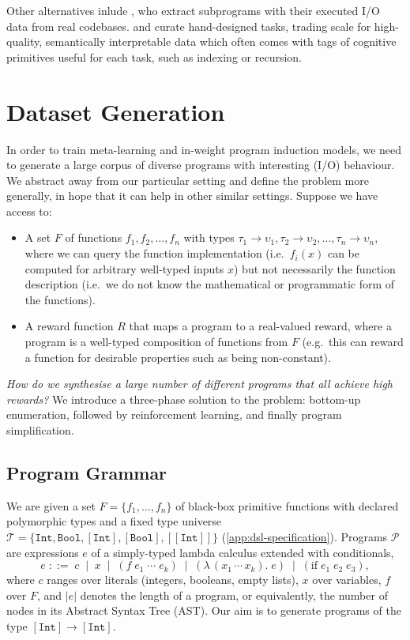 \documentclass[12pt]{article}
\begin{document}
Other alternatives inlude \citet{alet2021largescale}, who extract subprograms with their executed I/O data from real codebases. \citet{chollet2019measure} and \citet{rule2024symbolic} curate hand-designed tasks, trading scale for high-quality, semantically interpretable data which often comes with tags of cognitive primitives useful for each task, such as indexing or recursion.

\section{Dataset Generation}
\label{sec:dataset-generation}

In order to train meta-learning and in-weight program induction models, we need to generate a large corpus of diverse programs with interesting  (I/O) behaviour. We abstract away from our particular setting and define the problem more generally, in hope that it can help in other similar settings. Suppose we have access to:
\begin{itemize}
  \item A set $F$ of functions $f_1, f_2, \ldots, f_n$ with types
        $\tau_1 \to \upsilon_1, \tau_2 \to \upsilon_2, \ldots, \tau_n \to \upsilon_n$,
        where we can query the function implementation (i.e.\ $f_i(x)$ can be computed
        for arbitrary well-typed inputs $x$) but not necessarily the function description
        (i.e.\ we do not know the mathematical or programmatic form of the functions).
  \item A reward function $R$ that maps a program to a
        real-valued reward, where a program is a well-typed composition of functions from
        $F$ (e.g.\ this can reward a function for desirable properties such as being
        non-constant).
\end{itemize}

{\it How do we synthesise a large number of different programs that all achieve high rewards?} We introduce a three-phase solution to the problem: bottom-up enumeration, followed by reinforcement learning, and finally program simplification.

\subsection{Program Grammar}

We are given a set $F = \{f_1, \ldots, f_n\}$ of black-box primitive functions with declared polymorphic types and a fixed type universe $\mathcal{T} = \{\texttt{Int}, \texttt{Bool}, [\texttt{Int}], [\texttt{Bool}], [[\texttt{Int}]]\}$ (\cref{app:dsl-specification}). Programs $\mathcal{P}$ are expressions $e$ of a simply-typed lambda calculus extended with conditionals,
\[
  e \;::=\; c \;\mid\; x \;\mid\; (f\;e_1\;\cdots\;e_k) \;\mid\; (\lambda\,(x_1\,\cdots\,x_k).\;e) \;\mid\; (\mathrm{if}\;e_1\;e_2\;e_3),
\]
where $c$ ranges over literals (integers, booleans, empty lists), $x$ over variables, $f$ over $F$, and $|e|$ denotes the length of a program, or equivalently, the number of nodes in its Abstract Syntax Tree (AST). Our aim is to generate programs of the type $[\texttt{Int}] \to [\texttt{Int}]$.
\end{document}
